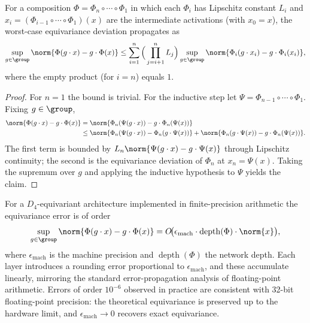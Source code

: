 \begin{proposition}
\label{prop:groups:error-propagation}
For a composition $\Phi = \Phi_n \circ \cdots \circ \Phi_1$ in which each
$\Phi_i$ has Lipschitz constant $L_i$ and $x_i = (\Phi_{i-1} \circ \cdots \circ
\Phi_1)(x)$ are the intermediate activations (with $x_0 = x$), the worst-case
equivariance deviation propagates as
\begin{equation}
  \sup_{g \in \group} \norm{\Phi(g \cdot x) - g \cdot \Phi(x)}
  \leq \sum_{i=1}^{n} \Big(\prod_{j=i+1}^{n} L_j\Big)
    \sup_{g \in \group} \norm{\Phi_i(g \cdot x_i) - g \cdot \Phi_i(x_i)},
\end{equation}
where the empty product (for $i = n$) equals $1$.
\end{proposition}

\begin{proof}
For $n = 1$ the bound is trivial. For the inductive step let $\Psi =
\Phi_{n-1} \circ \cdots \circ \Phi_1$. Fixing $g \in \group$,
\begin{align}
  \norm{\Phi(g \cdot x) - g \cdot \Phi(x)}
  &= \norm{\Phi_n(\Psi(g \cdot x)) - g \cdot \Phi_n(\Psi(x))} \\
  &\leq \norm{\Phi_n(\Psi(g \cdot x)) - \Phi_n(g \cdot \Psi(x))}
      + \norm{\Phi_n(g \cdot \Psi(x)) - g \cdot \Phi_n(\Psi(x))}.
\end{align}
The first term is bounded by $L_n \norm{\Psi(g \cdot x) - g \cdot \Psi(x)}$
through Lipschitz continuity; the second is the equivariance deviation of
$\Phi_n$ at $x_n = \Psi(x)$. Taking the supremum over $g$ and applying the
inductive hypothesis to $\Psi$ yields the claim.
\end{proof}

\begin{remark}
\label{rem:groups:numerical-stability}
For a $D_4$-equivariant architecture implemented in finite-precision arithmetic
the equivariance error is of order
\begin{equation}
  \sup_{g \in \group} \norm{\Phi(g \cdot x) - g \cdot \Phi(x)}
  = O\!\big(\epsilon_{\text{mach}} \cdot \operatorname{depth}(\Phi)
    \cdot \norm{x}\big),
\end{equation}
where $\epsilon_{\text{mach}}$ is the machine precision and
$\operatorname{depth}(\Phi)$ the network depth. Each layer introduces a rounding
error proportional to $\epsilon_{\text{mach}}$, and these accumulate linearly,
mirroring the standard error-propagation analysis of floating-point arithmetic.
Errors of order $10^{-6}$ observed in practice are consistent with 32-bit
floating-point precision: the theoretical equivariance is preserved up to the
hardware limit, and $\epsilon_{\text{mach}} \to 0$ recovers exact equivariance.
\end{remark}

